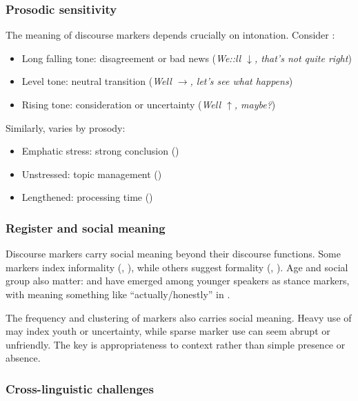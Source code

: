 \subsubsection*{Prosodic sensitivity}

The meaning of discourse markers depends crucially on intonation. Consider :

\begin{itemize}[noitemsep]
   \item Long falling tone: disagreement or bad news (\textit{We::ll $\downarrow$, that's not quite right})
   \item Level tone: neutral transition (\textit{Well $\rightarrow$, let's see what happens})
   \item Rising tone: consideration or uncertainty (\textit{Well $\uparrow$, maybe?})
\end{itemize}

Similarly,  varies by prosody:
\begin{itemize}[noitemsep]
   \item Emphatic stress: strong conclusion ()
   \item Unstressed: topic management ()
   \item Lengthened: processing time ()
\end{itemize}

\subsubsection*{Register and social meaning}

Discourse markers carry social meaning beyond their discourse functions. Some markers index informality (, ), while others suggest formality (, ). Age and social group also matter:  and  have emerged among younger speakers as stance markers, with  meaning something like \enquote{actually/honestly} in .

The frequency and clustering of markers also carries social meaning. Heavy use of  may index youth or uncertainty, while sparse marker use can seem abrupt or unfriendly. The key is appropriateness to context rather than simple presence or absence.

\subsubsection*{Cross-linguistic challenges}

